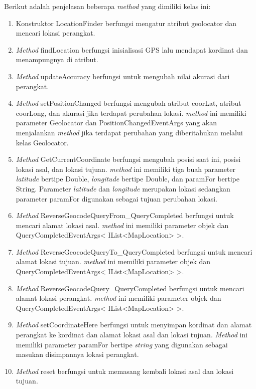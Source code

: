 Berikut adalah penjelasan beberapa \textit{method} yang dimiliki kelas ini:
\begin{enumerate}
	\item Konstruktor LocationFinder berfungsi mengatur atribut geolocator dan mencari lokasi perangkat.
	\item \textit{Method} findLocation berfungsi inisialisasi GPS lalu mendapat kordinat dan menampungnya di atribut.
	\item \textit{Method} updateAccuracy berfungsi untuk mengubah nilai akurasi dari perangkat.
	\item \textit{Method} setPositionChanged berfungsi mengubah atribut coorLat, atribut coorLong, dan akurasi jika terdapat perubahan lokasi. \textit{method} ini memiliki parameter Geolocator dan PositionChangedEventArgs yang akan menjalankan \textit{method} jika terdapat perubahan yang diberitahukan melalui kelas Geolocator.
	\item \textit{Method} GetCurrentCoordinate berfungsi mengubah posisi saat ini, posisi lokasi asal, dan lokasi tujuan. \textit{method} ini memiliki tiga buah parameter \textit{latitude} bertipe Double, \textit{longitude} bertipe Double, dan paramFor bertipe String. Parameter \textit{latitude} dan \textit{longitude} merupakan lokasi sedangkan parameter paramFor digunakan sebagai tujuan perubahan lokasi. 
	\item \textit{Method} ReverseGeocodeQueryFrom\_QueryCompleted berfungsi untuk mencari alamat lokasi asal. \textit{method} ini memiliki parameter objek dan QueryCompletedEventArgs< IList<MapLocation> >.
	\item \textit{Method} ReverseGeocodeQueryTo\_QueryCompleted berfungsi untuk mencari alamat lokasi tujuan. \textit{method} ini memiliki parameter objek dan QueryCompletedEventArgs< IList<MapLocation> >.
	\item \textit{Method} ReverseGeocodeQuery\_QueryCompleted berfungsi untuk mencari alamat lokasi perangkat. \textit{method} ini memiliki parameter objek dan QueryCompletedEventArgs< IList<MapLocation> >.
	\item \textit{Method} setCoordinateHere berfungsi untuk menyimpan kordinat dan alamat perangkat ke kordinat dan alamat lokasi asal dan lokasi tujuan. \textit{Method} ini memiliki parameter paramFor bertipe \textit{string} yang digunakan sebagai masukan disimpannya lokasi perangkat.
	\item \textit{Method} reset berfungsi untuk memasang kembali lokasi asal dan lokasi tujuan.
\end{enumerate}

